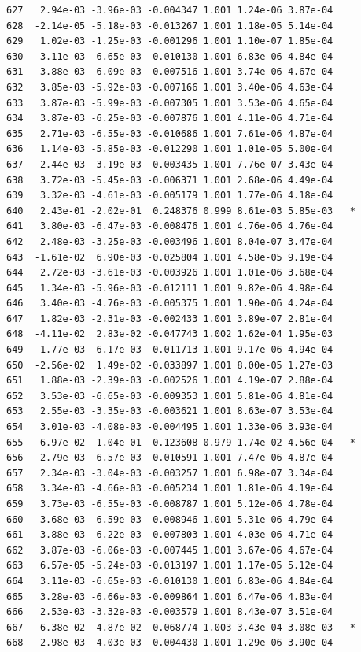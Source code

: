 \documentclass[
  letterpaper,
  DIV=11,
  numbers=noendperiod]{scrartcl}
\begin{document}
\begin{verbatim}
627   2.94e-03 -3.96e-03 -0.004347 1.001 1.24e-06 3.87e-04    
628  -2.14e-05 -5.18e-03 -0.013267 1.001 1.18e-05 5.14e-04    
629   1.02e-03 -1.25e-03 -0.001296 1.001 1.10e-07 1.85e-04    
630   3.11e-03 -6.65e-03 -0.010130 1.001 6.83e-06 4.84e-04    
631   3.88e-03 -6.09e-03 -0.007516 1.001 3.74e-06 4.67e-04    
632   3.85e-03 -5.92e-03 -0.007166 1.001 3.40e-06 4.63e-04    
633   3.87e-03 -5.99e-03 -0.007305 1.001 3.53e-06 4.65e-04    
634   3.87e-03 -6.25e-03 -0.007876 1.001 4.11e-06 4.71e-04    
635   2.71e-03 -6.55e-03 -0.010686 1.001 7.61e-06 4.87e-04    
636   1.14e-03 -5.85e-03 -0.012290 1.001 1.01e-05 5.00e-04    
637   2.44e-03 -3.19e-03 -0.003435 1.001 7.76e-07 3.43e-04    
638   3.72e-03 -5.45e-03 -0.006371 1.001 2.68e-06 4.49e-04    
639   3.32e-03 -4.61e-03 -0.005179 1.001 1.77e-06 4.18e-04    
640   2.43e-01 -2.02e-01  0.248376 0.999 8.61e-03 5.85e-03   *
641   3.80e-03 -6.47e-03 -0.008476 1.001 4.76e-06 4.76e-04    
642   2.48e-03 -3.25e-03 -0.003496 1.001 8.04e-07 3.47e-04    
643  -1.61e-02  6.90e-03 -0.025804 1.001 4.58e-05 9.19e-04    
644   2.72e-03 -3.61e-03 -0.003926 1.001 1.01e-06 3.68e-04    
645   1.34e-03 -5.96e-03 -0.012111 1.001 9.82e-06 4.98e-04    
646   3.40e-03 -4.76e-03 -0.005375 1.001 1.90e-06 4.24e-04    
647   1.82e-03 -2.31e-03 -0.002433 1.001 3.89e-07 2.81e-04    
648  -4.11e-02  2.83e-02 -0.047743 1.002 1.62e-04 1.95e-03    
649   1.77e-03 -6.17e-03 -0.011713 1.001 9.17e-06 4.94e-04    
650  -2.56e-02  1.49e-02 -0.033897 1.001 8.00e-05 1.27e-03    
651   1.88e-03 -2.39e-03 -0.002526 1.001 4.19e-07 2.88e-04    
652   3.53e-03 -6.65e-03 -0.009353 1.001 5.81e-06 4.81e-04    
653   2.55e-03 -3.35e-03 -0.003621 1.001 8.63e-07 3.53e-04    
654   3.01e-03 -4.08e-03 -0.004495 1.001 1.33e-06 3.93e-04    
655  -6.97e-02  1.04e-01  0.123608 0.979 1.74e-02 4.56e-04   *
656   2.79e-03 -6.57e-03 -0.010591 1.001 7.47e-06 4.87e-04    
657   2.34e-03 -3.04e-03 -0.003257 1.001 6.98e-07 3.34e-04    
658   3.34e-03 -4.66e-03 -0.005234 1.001 1.81e-06 4.19e-04    
659   3.73e-03 -6.55e-03 -0.008787 1.001 5.12e-06 4.78e-04    
660   3.68e-03 -6.59e-03 -0.008946 1.001 5.31e-06 4.79e-04    
661   3.88e-03 -6.22e-03 -0.007803 1.001 4.03e-06 4.71e-04    
662   3.87e-03 -6.06e-03 -0.007445 1.001 3.67e-06 4.67e-04    
663   6.57e-05 -5.24e-03 -0.013197 1.001 1.17e-05 5.12e-04    
664   3.11e-03 -6.65e-03 -0.010130 1.001 6.83e-06 4.84e-04    
665   3.28e-03 -6.66e-03 -0.009864 1.001 6.47e-06 4.83e-04    
666   2.53e-03 -3.32e-03 -0.003579 1.001 8.43e-07 3.51e-04    
667  -6.38e-02  4.87e-02 -0.068774 1.003 3.43e-04 3.08e-03   *
668   2.98e-03 -4.03e-03 -0.004430 1.001 1.29e-06 3.90e-04    

\end{verbatim}
\end{document}
